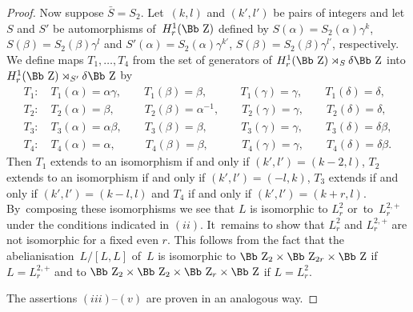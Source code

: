 \documentclass[10pt,a4paper]{amsart}
\newcommand\ZZ{{\mbox{\Bb Z}}}
\numberwithin{equation}{section}
\begin{document}
\begin{proof}
Now suppose $\bar S=S_2$. Let~$(k,l)$ and $(k',l')$ be pairs of integers and let $S$ and $S'$ be automorphisms of~$H^1_r(\ZZ)$ defined by $S(\alpha)=S_2(\alpha)\gamma^k$, $S(\beta)=S_2(\beta)\gamma^l$ and $S'(\alpha)=S_2(\alpha)\gamma^{k'}$, $S(\beta)=S_2(\beta)\gamma^{l'}$, respectively.
We define maps $T_1,\dots,T_4$ from the set of generators of $H^1_r(\ZZ)\rtimes_S \delta \ZZ$ into $H^1_r(\ZZ)\rtimes_{S'} \delta \ZZ$ by
\begin{gather*}
T_1\colon\quad T_1(\alpha)=\alpha \gamma,\qquad T_1(\beta)=\beta,\qquad \phantom{{}^{-1}}T_1(\gamma)=\gamma,\qquad T_1(\delta)=\delta,
\\
T_2\colon\quad T_2(\alpha)=\beta,\qquad \phantom{\alpha}T_2(\beta)=\alpha^{-1},\qquad T_2(\gamma)=\gamma,\qquad T_2(\delta)=\delta,
\\
T_3\colon\quad T_3(\alpha)=\alpha\beta,\qquad T_3(\beta)=\beta,\qquad \phantom{{}^{-1}}T_3(\gamma)=\gamma,\qquad T_3(\delta)=\delta\beta,
\\
T_4\colon\quad T_4(\alpha)=\alpha,\qquad \phantom{\alpha}T_4(\beta)=\beta,\qquad \phantom{{}^{-1}}T_4(\gamma)=\gamma,\qquad T_4(\delta)=\delta\beta.
\end{gather*}
Then $T_1$ extends to an isomorphism if and only if $(k',l')=(k-2,l)$, $T_2$ extends to an isomorphism if and only if $(k',l')=(-l,k)$, $T_3$ extends if and only if $(k',l')=(k-l,l)$ and $T_4$ if and only if $(k',l')=(k+r,l)$. By~composing these isomorphisms we see that $L$ is isomorphic to $L^2_r$ or~to~$L^{2,+}_r$ under the conditions indicated in $(ii)$. It~remains to show that $L_r^2$ and $L_r^{2,+}$ are not isomorphic for a fixed even $r$. This follows from the fact that the abelianisation~$L/[L,L]$ of~$L$ is isomorphic to $\ZZ_2\times\ZZ_{2r}\times\ZZ$ if $L=L^{2,+}_{r}$ and to $\ZZ_2\times\ZZ_2\times\ZZ_r\times\ZZ$ if $L=L^2_{r}$.

The assertions $(iii)$--$(v)$ are proven in an analogous way.
\end{proof}
\end{document}
